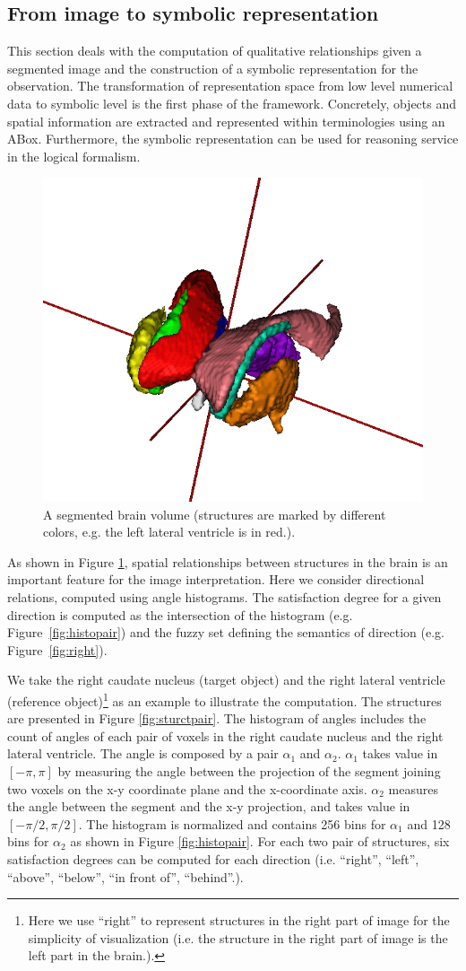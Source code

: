 \documentclass{article}
\begin{document}
\subsection{From image to symbolic representation}
 This section deals with the computation of qualitative relationships given a segmented image and the construction of a symbolic representation for the observation. 
The transformation of representation space from low level numerical data to symbolic level is the first phase of the framework.
Concretely, objects and spatial information are extracted and represented within terminologies using an ABox.
Furthermore, the symbolic representation can be used for  reasoning service in the logical formalism.

\begin{figure}[h]
 \centering
 \includegraphics[width=.3\textwidth]{./figures/mesh_all_vue_45.png}
 \caption{\label{fig:brain3d}A segmented brain volume (structures are marked by different colors, e.g. the left lateral ventricle is in red.).}
\end{figure}
As  shown in Figure \ref{fig:brain3d}, spatial relationships between structures in the brain is an important feature for the image interpretation. 
Here we consider directional relations, computed using angle histograms.
The satisfaction degree for a given direction is computed as the intersection of the histogram (e.g. Figure~\ref{fig:histopair}) and the fuzzy set defining the semantics of direction (e.g. Figure~\ref{fig:right}).

We take the right caudate nucleus (target object) and the right lateral ventricle (reference object)\footnote{Here we use ``right'' to represent 
structures in the right part of image for the simplicity of visualization (i.e. the structure in the right part of image is the left part in the brain.).} as an example to illustrate the computation.
The structures are presented in Figure \ref{fig:sturctpair}.
The histogram of angles includes the count of angles of each pair of voxels in the right caudate nucleus and the right lateral ventricle.
The angle is composed by a pair $\alpha_1$ and $\alpha_2$. 
$\alpha_1$ takes value in $[-\pi, \pi]$ by measuring the angle between the projection of the segment joining two voxels on the x-y coordinate plane and the x-coordinate axis.
$\alpha_2$ measures the angle between the segment and the x-y projection, and takes value in $[-\pi/2, \pi/2]$.
The histogram is normalized and contains 256 bins for $\alpha_1$ and 128 bins for $\alpha_2$ as shown in Figure \ref{fig:histopair}.
For each two pair of structures, six satisfaction degrees can be computed for each direction (i.e. ``right'', ``left'', ``above'', ``below'', ``in front of'', ``behind''.).
\end{document}
